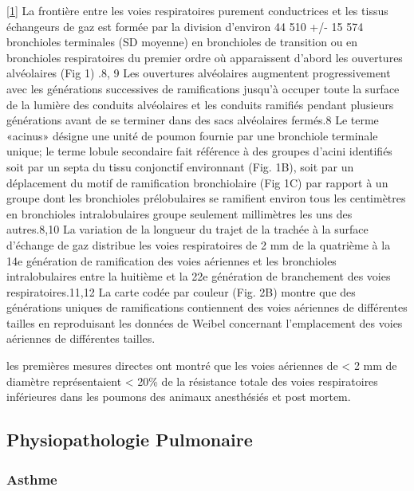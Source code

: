 \documentclass[12pt,]{article}
\begin{document}
{[}\protect\hyperlink{ref-hogg2013small}{1}{]} La frontière entre les
voies respiratoires purement conductrices et les tissus échangeurs de
gaz est formée par la division d'environ 44 510 +/- 15 574 bronchioles
terminales (SD moyenne) en bronchioles de transition ou en bronchioles
respiratoires du premier ordre où apparaissent d'abord les ouvertures
alvéolaires (Fig 1) .8, 9 Les ouvertures alvéolaires augmentent
progressivement avec les générations successives de ramifications
jusqu'à occuper toute la surface de la lumière des conduits alvéolaires
et les conduits ramifiés pendant plusieurs générations avant de se
terminer dans des sacs alvéolaires fermés.8 Le terme «acinus» désigne
une unité de poumon fournie par une bronchiole terminale unique; le
terme lobule secondaire fait référence à des groupes d'acini identifiés
soit par un septa du tissu conjonctif environnant (Fig. 1B), soit par un
déplacement du motif de ramification bronchiolaire (Fig 1C) par rapport
à un groupe dont les bronchioles prélobulaires se ramifient environ tous
les centimètres en bronchioles intralobulaires groupe seulement
millimètres les uns des autres.8,10 La variation de la longueur du
trajet de la trachée à la surface d'échange de gaz distribue les voies
respiratoires de 2 mm de la quatrième à la 14e génération de
ramification des voies aériennes et les bronchioles intralobulaires
entre la huitième et la 22e génération de branchement des voies
respiratoires.11,12 La carte codée par couleur (Fig. 2B) montre que des
générations uniques de ramifications contiennent des voies aériennes de
différentes tailles en reproduisant les données de Weibel concernant
l'emplacement des voies aériennes de différentes tailles.

les premières mesures directes ont montré que les voies aériennes de
\textless{} 2 mm de diamètre représentaient \textless{} 20\% de la
résistance totale des voies respiratoires inférieures dans les poumons
des animaux anesthésiés et post mortem.

\hypertarget{physiopathologie-pulmonaire}{%
\subsection{Physiopathologie
Pulmonaire}\label{physiopathologie-pulmonaire}}

\hypertarget{asthme}{%
\subsubsection{Asthme}\label{asthme}}
\end{document}
